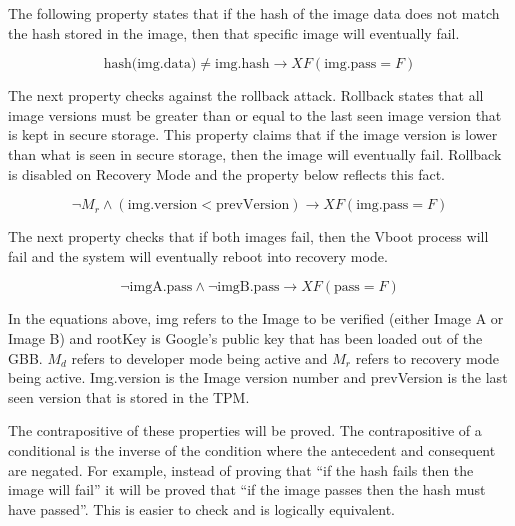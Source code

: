 The following property states that if the hash of the image data does not match the hash stored in the image, then that specific image will eventually fail.

\begin{equation} \label{eq:hash_cor}
    \text{hash(img.data)} \neq \text{img.hash} \to XF (\text{img.pass} = F)
\end{equation}

The next property checks against the rollback attack. 
Rollback states that all image versions must be greater than or equal to the last seen image version that is kept in secure storage. 
This property claims that if the image version is lower than what is seen in secure storage, then the image will eventually fail.
Rollback is disabled on Recovery Mode and the property below reflects this fact.

\begin{equation} \label{eq:rollback}
    \lnot M_r \land (\text{img.version} < \text{prevVersion}) \to XF (\text{img.pass} = F)
\end{equation}

The next property checks that if both images fail, then the Vboot process will fail and the system will eventually reboot into recovery mode.

\begin{equation} \label{eq:both-fail}
    \lnot \text{imgA.pass} \land \lnot \text{imgB.pass} \to XF (\text{pass} = F)
\end{equation}



In the equations above, img refers to the Image to be verified (either Image A or Image B)  and rootKey is Google's public key that has been loaded out of the GBB.
$M_d$ refers to developer mode being active and $M_r$ refers to recovery mode being active.
Img.version is the Image version number and prevVersion is the last seen version that is stored in the TPM\@.

The contrapositive of these properties will be proved.
The contrapositive of a conditional is the inverse of the condition where the antecedent and consequent are negated.
For example, instead of proving that ``if the hash fails then the image will fail'' it will be proved that ``if the image passes then the hash must have passed''. 
This is easier to check and is logically equivalent.


